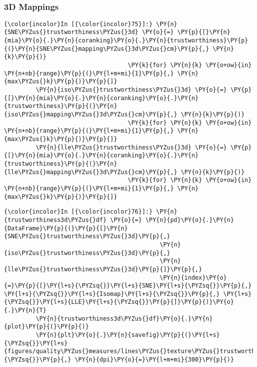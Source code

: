     \begin{center}
    \end{center}
    { \hspace*{\fill} \\}

    \subsubsection{3D Mappings}\label{d-mappings}

    \begin{Verbatim}[commandchars=\\\{\}]
{\color{incolor}In [{\color{incolor}75}]:} \PY{n}{SNE\PYZus{}trustworthiness\PYZus{}3d} \PY{o}{=} \PY{p}{[}\PY{n}{mia}\PY{o}{.}\PY{n}{coranking}\PY{o}{.}\PY{n}{trustworthiness}\PY{p}{(}\PY{n}{SNE\PYZus{}mapping\PYZus{}3d\PYZus{}cm}\PY{p}{,} \PY{n}{k}\PY{p}{)}
                                   \PY{k}{for} \PY{n}{k} \PY{o+ow}{in} \PY{n+nb}{range}\PY{p}{(}\PY{l+m+mi}{1}\PY{p}{,} \PY{n}{max\PYZus{}k}\PY{p}{)}\PY{p}{]}
         \PY{n}{iso\PYZus{}trustworthiness\PYZus{}3d} \PY{o}{=} \PY{p}{[}\PY{n}{mia}\PY{o}{.}\PY{n}{coranking}\PY{o}{.}\PY{n}{trustworthiness}\PY{p}{(}\PY{n}{iso\PYZus{}mapping\PYZus{}3d\PYZus{}cm}\PY{p}{,} \PY{n}{k}\PY{p}{)}
                                   \PY{k}{for} \PY{n}{k} \PY{o+ow}{in} \PY{n+nb}{range}\PY{p}{(}\PY{l+m+mi}{1}\PY{p}{,} \PY{n}{max\PYZus{}k}\PY{p}{)}\PY{p}{]}
         \PY{n}{lle\PYZus{}trustworthiness\PYZus{}3d} \PY{o}{=} \PY{p}{[}\PY{n}{mia}\PY{o}{.}\PY{n}{coranking}\PY{o}{.}\PY{n}{trustworthiness}\PY{p}{(}\PY{n}{lle\PYZus{}mapping\PYZus{}3d\PYZus{}cm}\PY{p}{,} \PY{n}{k}\PY{p}{)}
                                   \PY{k}{for} \PY{n}{k} \PY{o+ow}{in} \PY{n+nb}{range}\PY{p}{(}\PY{l+m+mi}{1}\PY{p}{,} \PY{n}{max\PYZus{}k}\PY{p}{)}\PY{p}{]}
\end{Verbatim}

    \begin{Verbatim}[commandchars=\\\{\}]
{\color{incolor}In [{\color{incolor}76}]:} \PY{n}{trustworthiness3d\PYZus{}df} \PY{o}{=} \PY{n}{pd}\PY{o}{.}\PY{n}{DataFrame}\PY{p}{(}\PY{p}{[}\PY{n}{SNE\PYZus{}trustworthiness\PYZus{}3d}\PY{p}{,}
                                            \PY{n}{iso\PYZus{}trustworthiness\PYZus{}3d}\PY{p}{,}
                                            \PY{n}{lle\PYZus{}trustworthiness\PYZus{}3d}\PY{p}{]}\PY{p}{,}
                                            \PY{n}{index}\PY{o}{=}\PY{p}{[}\PY{l+s}{\PYZsq{}}\PY{l+s}{SNE}\PY{l+s}{\PYZsq{}}\PY{p}{,} \PY{l+s}{\PYZsq{}}\PY{l+s}{Isomap}\PY{l+s}{\PYZsq{}}\PY{p}{,} \PY{l+s}{\PYZsq{}}\PY{l+s}{LLE}\PY{l+s}{\PYZsq{}}\PY{p}{]}\PY{p}{)}\PY{o}{.}\PY{n}{T}
         \PY{n}{trustworthiness3d\PYZus{}df}\PY{o}{.}\PY{n}{plot}\PY{p}{(}\PY{p}{)}
         \PY{n}{plt}\PY{o}{.}\PY{n}{savefig}\PY{p}{(}\PY{l+s}{\PYZsq{}}\PY{l+s}{figures/quality\PYZus{}measures/lines\PYZus{}texture\PYZus{}trustworthiness\PYZus{}3d.png}\PY{l+s}{\PYZsq{}}\PY{p}{,} \PY{n}{dpi}\PY{o}{=}\PY{l+m+mi}{300}\PY{p}{)}
\end{Verbatim}

